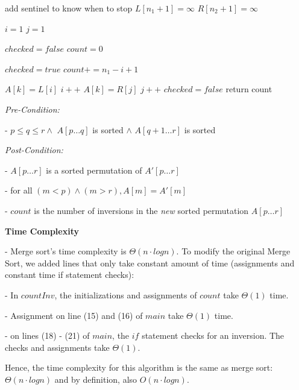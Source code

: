 \documentclass[a4paper]{report}
\begin{document}
\begin{enumerate}
\begin{algorithmic}[1]
          \Comment add sentinel to know when to stop
          \State $L[n_1 + 1] = \infty$
          \State $R[n_2 + 1] = \infty$

          \State $i = 1$
          \State $j = 1$

          \State $checked = false$
          \State $count = 0$

              \State $checked = true$
              \State $count += n_1 - i + 1$
            \EndIf

              \State $A[k] = L[i]$
              \State $i++$
            \Else 
              \State $A[k] = R[j]$
              \State $j++$
              \State $checked = false$
            \EndIf
          \EndFor
          \State return count
        \EndFunction
      \end{algorithmic}

      {\it Pre-Condition:}

        - $p \leq q \leq r \wedge$ $A[p\dots q]$ is sorted $\wedge$ $A[q+1\dots r]$ is sorted 

      {\it Post-Condition:}

        - $A[p\dots r]$ is a sorted permutation of $A'[p \dots r]$

        - for all $(m < p) \wedge (m > r), A[m] = A'[m]$

        - $count$ is the number of inversions in the {\it new} sorted permutation $A[p \dots r]$



      
     {\bf Time Complexity}
      
        - Merge sort's time complexity is $\Theta(n \cdot log n)$. To modify the original Merge Sort, we added lines that only
        take constant amount of time (assignments and constant time if statement checks):

        - In $countInv$, the initializations and assignments of $count$ take $\Theta(1)$ time.

        - Assignment on line (15) and (16) of $main$ take $\Theta(1)$ time.

        - on lines (18) - (21) of $main$, the $if$ statement checks for an inversion. The checks and assignments take $\Theta(1)$.

        Hence, the time complexity for this algorithm is the same as merge sort: $\Theta(n \cdot log n)$ and by definition,
        also $O(n \cdot log n)$.
        






\end{enumerate}
\end{document}

